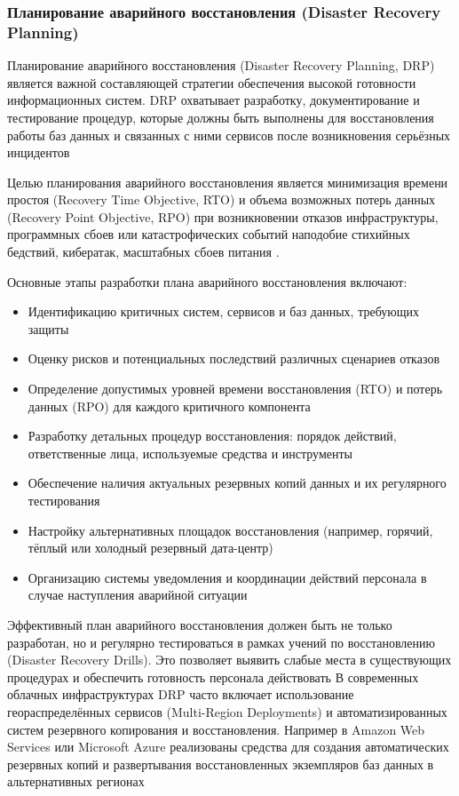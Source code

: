 
\subsubsection{Планирование аварийного восстановления (Disaster Recovery Planning)}

Планирование аварийного восстановления (Disaster Recovery Planning, DRP) является важной составляющей стратегии обеспечения высокой готовности информационных систем. DRP охватывает разработку, документирование и тестирование процедур, которые должны быть выполнены для восстановления работы баз данных и связанных с ними сервисов после возникновения серьёзных инцидентов %

Целью планирования аварийного восстановления является минимизация времени простоя (Recovery Time Objective, RTO) и объема возможных потерь данных (Recovery Point Objective, RPO) при возникновении отказов инфраструктуры, программных сбоев или катастрофических событий наподобие стихийных бедствий, кибератак, масштабных сбоев питания \autocite{Kleppmann}.

Основные этапы разработки плана аварийного восстановления включают:
\begin{itemize}
    \item Идентификацию критичных систем, сервисов и баз данных, требующих защиты
    \item Оценку рисков и потенциальных последствий различных сценариев отказов
    \item Определение допустимых уровней времени восстановления (RTO) и потерь данных (RPO) для каждого критичного компонента
    \item Разработку детальных процедур восстановления: порядок действий, ответственные лица, используемые средства и инструменты
    \item Обеспечение наличия актуальных резервных копий данных и их регулярного тестирования
    \item Настройку альтернативных площадок восстановления (например, горячий, тёплый или холодный резервный дата-центр) \autocite{RajeshBasa}
    \item Организацию системы уведомления и координации действий персонала в случае наступления аварийной ситуации
\end{itemize}
Эффективный план аварийного восстановления должен быть не только разработан, но и регулярно тестироваться в рамках учений по восстановлению (Disaster Recovery Drills). Это позволяет выявить слабые места в существующих процедурах и обеспечить готовность персонала действовать %
В современных облачных инфраструктурах DRP часто включает использование геораспределённых сервисов (Multi-Region Deployments) и автоматизированных систем резервного копирования и восстановления. Например в Amazon Web Services или Microsoft Azure реализованы средства для создания автоматических резервных копий и развертывания восстановленных экземпляров баз данных в альтернативных регионах %


